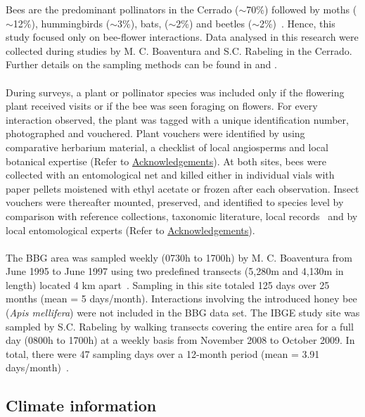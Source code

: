 \documentclass[11pt]{article}
\begin{document}
Bees are the predominant pollinators in the Cerrado ($\sim$70\%) followed by moths ($\sim$12\%), hummingbirds ($\sim$3\%), bats, ($\sim$2\%) and beetles ($\sim$2\%)~\citep{Oliveira2002, Gottsberger2006a, Cappellari2011}. Hence, this study focused only on bee-flower interactions. Data analysed in this research were collected during studies by M. C. Boaventura and S.C. Rabeling in the Cerrado. Further details on the sampling methods can be found in \cite{Boaventura1998} and \cite{Cappellari2011}.\\
\\
During surveys, a plant or pollinator species was included only if the flowering plant received visits or if the bee was seen foraging on flowers. For every interaction observed, the plant was tagged with a unique identification number, photographed and vouchered. Plant vouchers were identified by using comparative herbarium material, a checklist of local angiosperms and local botanical expertise (Refer to \hyperref[sec: acknowledgements]{Acknowledgements}). At both sites, bees were collected with an entomological net and killed either in individual vials with paper pellets moistened with ethyl acetate or frozen after each observation. Insect vouchers were thereafter mounted, preserved, and identified to species level by comparison with reference collections, taxonomic literature, local records~\citep{Moure1962, Silveira2002, Michener2007, Moure2007} and by local entomological experts (Refer to \hyperref[sec: acknowledgements]{Acknowledgements}). \\
\\
The BBG area was sampled weekly (0730h to 1700h) by M. C. Boaventura from June 1995 to June 1997 using two predefined transects (5,280m and 4,130m in length) located 4 km apart~\citep{Boaventura1998}. Sampling in this site totaled 125 days over 25 months (mean = 5 days/month). Interactions involving the introduced honey bee (\textit{Apis mellifera}) were not included in the BBG data set. The IBGE study site was sampled by S.C. Rabeling by walking transects covering the entire area for a full day (0800h to 1700h) at a weekly basis from November 2008 to October 2009. In total, there were 47 sampling days over a 12-month period (mean = 3.91 days/month)~\citep{Cappellari2011}. 

\subsection{Climate information}
\end{document}
